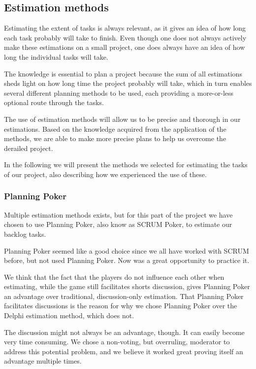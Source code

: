 \subsection{Estimation methods}
Estimating the extent of tasks is always relevant, as it gives an idea of how long each task probably will take to finish. Even though one does not always actively make these estimations on a small project, one does always have an idea of how long the individual tasks will take.

The knowledge is essential to plan a project because the sum of all estimations sheds light on how long time the project probably will take, which in turn enables several different planning methods to be used, each providing a more-or-less optional route through the tasks.

The use of estimation methods will allow us to be precise and thorough in our estimations. Based on the knowledge acquired from the application of the methods, we are able to make more precise plans to help us overcome the derailed project.

In the following we will present the methods we selected for estimating the tasks of our project, also describing how we experienced the use of these.

\subsubsection{Planning Poker}
Multiple estimation methods exists, but for this part of the project we have chosen to use Planning Poker, also know as SCRUM Poker, to estimate our backlog tasks.

Planning Poker seemed like a good choice since we all have worked with SCRUM before, but not used Planning Poker. Now was a great opportunity to practice it.

We think that the fact that the players do not influence each other when estimating, while the game still facilitates shorts discussion, gives Planning Poker an advantage over traditional, discussion-only estimation.
That Planning Poker facilitates discussions is the reason for why we chose Planning Poker over the Delphi estimation method, which does not.

The discussion might not always be an advantage, though. It can easily become very time consuming. We chose a non-voting, but overruling, moderator to address this potential problem, and we believe it worked great proving itself an advantage multiple times.

